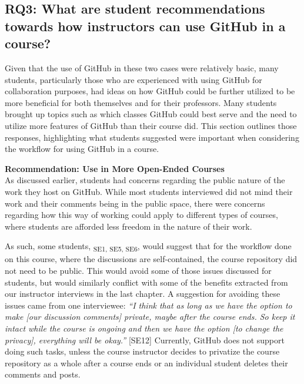 \subsection{RQ3: What are student recommendations towards how instructors can use GitHub in a course?}

Given that the use of GitHub in these two cases were relatively basic, many students, particularly those who are experienced with using GitHub for collaboration purposes, had ideas on how GitHub could be further utilized to be more beneficial for both themselves and for their professors. Many students brought up topics such as which classes GitHub could best serve and the need to utilize more features of GitHub than their course did. This section outlines those responses, highlighting what students suggested were important when considering the workflow for using GitHub in a course.

\textbf{Recommendation: Use in More Open-Ended Courses} \\
As discussed earlier, students had concerns regarding the public nature of the work they host on GitHub. While most students interviewed did not mind their work and their comments being in the public space, there were concerns regarding how this way of working could apply to different types of courses, where students are afforded less freedom in the nature of their work. %

As such, some students, \textsubscript{SE1, SE5, SE6}, would suggest that for the workflow done on this course, where the discussions are self-contained, the course repository did not need to be public. This would avoid some of those issues discussed for students, but would similarly conflict with some of the benefits extracted from our instructor interviews in the last chapter. A suggestion for avoiding these issues came from one interviewee: \textit{``I think that as long as we have the option to make [our discussion comments] private, maybe after the course ends. So keep it intact while the course is ongoing and then we have the option [to change the privacy], everything will be okay.''} [SE12] Currently, GitHub does not support doing such tasks, unless the course instructor decides to privatize the course repository as a whole after a course ends or an individual student deletes their comments and posts. %


